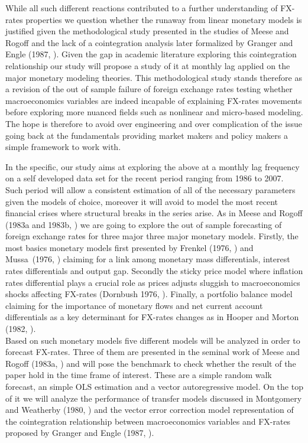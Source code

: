 \documentclass{article}
\begin{document}
While all such different reactions contributed to a further understanding of FX-rates properties we question whether the runaway from linear monetary models is justified given the methodological study presented in the studies of Meese and Rogoff and the lack of a cointegration analysis later formalized by Granger and Engle (1987,  \cite{EngleGranger}). Given the gap in academic literature exploring this cointegration relationship our study will propose a study of it at monthly lag applied on the major monetary modeling theories.  %
% 
%
This methodological study stands therefore as a revision of the out of sample failure of foreign exchange rates testing whether macroeconomics variables are indeed incapable of explaining FX-rates movements before exploring more nuanced fields such as nonlinear and micro-based modeling. The hope is therefore to avoid over engineering and over complication of the issue going back at the fundamentals providing market makers and policy makers a simple framework to work with.

In the specific, our study aims at exploring the above at a monthly lag frequency on a self developed data set for the recent period ranging from 1986 to 2007. Such period will allow a consistent estimation of all of the necessary parameters given the models of choice, moreover it will avoid to model the most recent financial crises where structural breaks in the series arise.
As in Meese and Rogoff (1983a and 1983b, \cite{MeeseRogoffa,MeeseRogoffb}) we are going to explore the out of sample forecasting of foreign exchange rates for three major three major monetary models. Firstly, the most basics monetary models first presented by Frenkel (1976, \cite{Frenkel1976}) and  Mussa\ (1976, \cite{Mussa1976}) claiming for a link among monetary mass differentials, interest rates differentials and output gap. Secondly the sticky price model where inflation rates differential plays a crucial role as prices adjusts sluggish to macroeconomics shocks affecting FX-rates (Dornbush 1976, \cite{Dornbusch}). Finally, a portfolio balance model claiming for the importance of monetary flows and net current account differentials as a key determinant for FX-rates changes as in Hooper and Morton (1982, \cite{HooperMorton1982}). \\
Based on such monetary models five different models will be analyzed in order to forecast FX-rates. Three of them are presented in the seminal work of Meese and Rogoff (1983a, \cite{MeeseRogoffa}) and will pose the benchmark to check whether the result of the paper hold in the time frame of interest. These are a simple random walk forecast, an simple OLS estimation and a vector autoregressive model. On the top of it we will analyze the performance of transfer models discussed in Montgomery and Weatherby (1980, \cite{MontgomeryWeatherby}) and the vector error correction model representation of the cointegration relationship between macroeconomics variables and FX-rates proposed by Granger and Engle (1987,  \cite{EngleGranger}).
\end{document}

